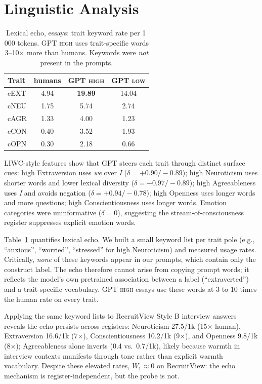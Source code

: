 \documentclass[10pt, a4paper]{article}
\begin{document}
\section{Linguistic Analysis}
\label{sec:analysis}

\begin{table}[t]
\caption{Lexical echo, essays: trait keyword rate per 1\,000 tokens. GPT \textsc{high} uses trait-specific words 3--10$\times$ more than humans. Keywords were \emph{not} present in the prompts.}
\label{tab:echo}
\begin{center}
\small
\begin{tabular}{lccc}
\toprule
Trait & humans & GPT \textsc{high} & GPT \textsc{low} \\
\midrule
cEXT & 4.94 & \textbf{19.89} & 14.04 \\
cNEU & 1.75 &  5.74          &  2.74 \\
cAGR & 1.33 &  4.00          &  1.23 \\
cCON & 0.40 &  3.52          &  1.93 \\
cOPN & 0.30 &  2.18          &  0.66 \\
\bottomrule
\end{tabular}
\end{center}
\end{table}

LIWC-style features show that GPT steers each trait through distinct surface cues: high Extraversion uses \emph{we} over \emph{I} ($\delta=+0.90/-0.89$); high Neuroticism uses shorter words and lower lexical diversity ($\delta=-0.97/-0.89$); high Agreeableness uses \emph{I} and avoids negation ($\delta=+0.94/-0.78$); high Openness uses longer words and more questions; high Conscientiousness uses longer words. Emotion categories \citep{mohammad-turney-2013-emolex} were uninformative ($\delta=0$), suggesting the stream-of-consciousness register suppresses explicit emotion words.

Table~\ref{tab:echo} quantifies lexical echo. We built a small keyword list per trait pole (e.g., ``anxious'', ``worried'', ``stressed'' for high Neuroticism) and measured usage rates. Critically, \emph{none} of these keywords appear in our prompts, which contain only the construct label. The echo therefore cannot arise from copying prompt words; it reflects the model's own pretrained association between a label (``extraverted'') and a trait-specific vocabulary. GPT \textsc{high} essays use these words at 3 to 10 times the human rate on every trait.

Applying the same keyword lists to RecruitView Style B interview answers reveals the echo persists across registers: Neuroticism 27.5/1k (15$\times$ human), Extraversion 16.6/1k (7$\times$), Conscientiousness 10.2/1k (9$\times$), and Openness 9.8/1k (8$\times$); Agreeableness alone inverts (0.4 vs.\ 0.7/1k), likely because warmth in interview contexts manifests through tone rather than explicit warmth vocabulary. Despite these elevated rates, $W_1\approx 0$ on RecruitView: the echo mechanism is register-independent, but the probe is not.
\end{document}
